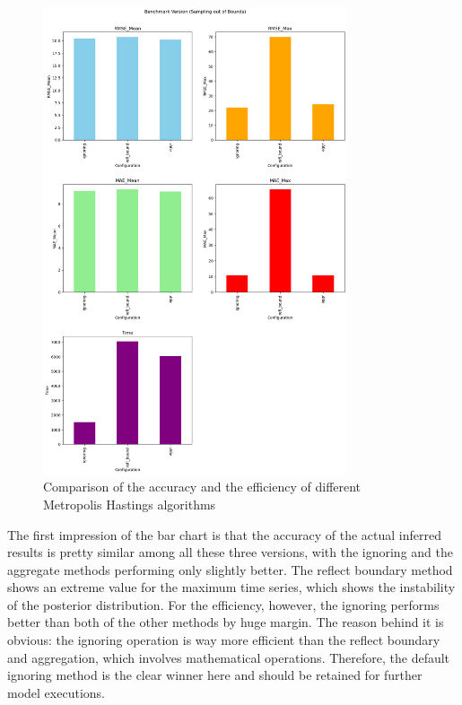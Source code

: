 \begin{figure}
    \centering
    \includegraphics[width=0.8\textwidth]{figures/basic_mh/benchmark/sampling_otb.png}
    \captionsetup{width=.8\textwidth}
    \caption{Comparison of the accuracy and the efficiency of different Metropolis Hastings algorithms}
    \label{fig:enter-label}
\end{figure}


The first impression of the bar chart is that the accuracy of the actual inferred results is pretty similar among all these three versions, with the ignoring and the aggregate methods performing only slightly better. The reflect boundary method shows an extreme value for the maximum time series, which shows the instability of the posterior distribution. For the efficiency, however, the ignoring performs better than both of the other methods by huge margin. The reason behind it is obvious: the ignoring operation is way more efficient than the reflect boundary and aggregation, which involves mathematical operations. Therefore, the default ignoring method is the clear winner here and should be retained for further model executions.

